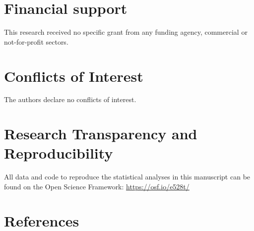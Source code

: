 \documentclass[
  man,floatsintext]{apa6}
\begin{document}
\hypertarget{financial-support}{%
\section{Financial support}\label{financial-support}}

This research received no specific grant from any funding agency, commercial or not-for-profit sectors.

\hypertarget{conflicts-of-interest}{%
\section{Conflicts of Interest}\label{conflicts-of-interest}}

The authors declare no conflicts of interest.

\hypertarget{research-transparency-and-reproducibility}{%
\section{Research Transparency and Reproducibility}\label{research-transparency-and-reproducibility}}

All data and code to reproduce the statistical analyses in this manuscript can be found on the Open Science Framework: \url{https://osf.io/e528t/}

\newpage

\hypertarget{references}{%
\section{References}\label{references}}

\begingroup
\setlength{\parindent}{-0.5in}
\setlength{\leftskip}{0.5in}
\end{document}
